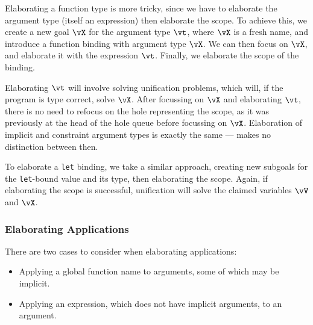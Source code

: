 Elaborating a function type is more tricky, since we have to elaborate the argument
type (itself an \IdrisM{} expression) then elaborate the scope. To achieve this, we
create a new goal $\vX$ for the argument type $\vt$, where $\vX$ is a fresh name,
and introduce a function binding with argument type $\vX$. We can then focus on
$\vX$, and elaborate it with the expression $\vt$. Finally, we elaborate the
scope of the binding.


Elaborating $\vt$ will involve solving unification problems, which will, if the
program is type correct, solve $\vX$. After focussing on $\vX$ and elaborating
$\vt$, there is no need to refocus on the hole representing the scope, as it was
previously at the head of the hole queue before focussing on $\vX$.
Elaboration of implicit and constraint
argument types is exactly the same --- \TT{} makes no distinction between then.

To elaborate a \texttt{let} binding, we take a similar approach, creating new subgoals
for the \texttt{let}-bound value and its type, then elaborating the scope. Again,
if elaborating the scope is successful, unification will solve the claimed variables
$\vV$ and $\vX$.

\subsubsection{Elaborating Applications}

\label{sect:elabapps}

There are two cases to consider when elaborating applications:

\begin{itemize}
\item Applying a global function name to arguments, some of which may be implicit.
\item Applying an expression, which does not have implicit arguments, to an argument.
\end{itemize}

